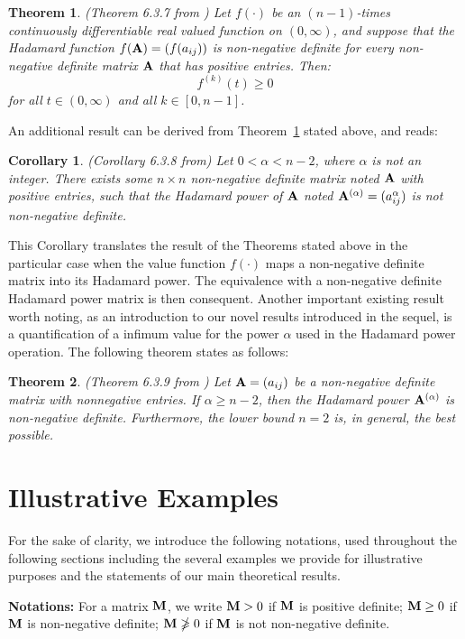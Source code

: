 \documentclass[conference,letterpaper]{IEEEtran}
\numberwithin{equation}{section}
\newcommand{\lbl}{\label}
\newcommand{\bd}{\bold}
\newtheorem{theorem}{{\sc Theorem}}[section]
\newtheorem{coro}{{\sc Corollary}}[section]
\begin{document}
\begin{theorem}\label{oldth2} (Theorem 6.3.7 from \cite{horn_johnson_1991})
	Let $f(\cdot)$ be an $(n-1)$-times continuously differentiable real valued function on $(0,\infty)$, and suppose that the Hadamard function $f(\bd{A})=(f(a_{ij}))$ is non-negative definite for every non-negative definite matrix $\bd{A}$ that has positive entries. Then:
$$f^{(k)}(t)\geq 0$$
 for all $t\in(0,\infty)$ and all $k \in [0,n-1]$.
\end{theorem}
An additional result can be derived from Theorem~\ref{oldth2} stated above, and reads:
\begin{coro}(Corollary 6.3.8 from\cite{horn_johnson_1991})
	Let $0<\alpha<n-2$, where $\alpha$ is not an integer. 
	There exists some $n\times n$ non-negative definite matrix noted $\bd{A}$ with positive entries, such that the Hadamard power of  $\bd{A}$ noted $\bd{A}^{(\alpha)}=(a_{ij}^\alpha)$ is not non-negative definite.
\end{coro}
This Corollary translates the result of the Theorems stated above in the particular case when the value function $f(\cdot)$ maps a non-negative definite matrix into its Hadamard power. 
The equivalence with a non-negative definite Hadamard power matrix is then consequent.
Another important existing result worth noting, as an introduction to our novel results introduced in the sequel, is a quantification of a infimum value for the power $\alpha$ used in the Hadamard power operation. The following theorem states as follows:
\begin{theorem} (Theorem 6.3.9 from \cite{horn_johnson_1991})
	Let $\bd{A}=(a_{ij})$ be a non-negative definite matrix with nonnegative entries. If $\alpha \geq n-2$, then the Hadamard power $\bd{A}^{(\alpha)}$ is non-negative definite. Furthermore, the lower bound $n=2$ is, in general, the best possible.
\end{theorem}


\section{Illustrative Examples}\lbl{sec:main}

For the sake of clarity, we introduce the following notations, used throughout the following sections including the several examples we provide for illustrative purposes and the statements of our main theoretical results.  

\medskip
\textbf{Notations: } For a matrix $\bd{M}$, we write $\bd{M}>0$ if $\bd{M}$ is positive definite; $\bd{M}\geq 0$ if $\bd{M}$ is non-negative definite; $\bd{M}\ngeqslant 0$ if $\bd{M}$ is not non-negative definite.
\end{document}
